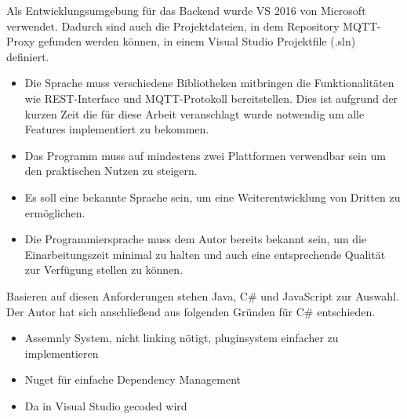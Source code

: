     Als Entwicklungsumgebung für das Backend wurde \ac{VS} 2016 \cite{microsoft_2019} von Microsoft verwendet. Dadurch sind auch die Projektdateien, in dem Repository \glqq MQTT-Proxy\grqq{} \cite{eisenschmidt_2019} gefunden werden können, in einem Visual Studio Projektfile (.sln) definiert.
    
    \begin{itemize}
        \item Die Sprache muss verschiedene Bibliotheken mitbringen die Funktionalitäten wie REST-Interface und \ac{MQTT}-Protokoll bereitstellen. Dies ist aufgrund der kurzen Zeit die für diese Arbeit veranschlagt wurde notwendig um alle Features implementiert zu bekommen.
        \item Das Programm muss auf mindestens zwei Plattformen verwendbar sein um den praktischen Nutzen zu steigern.
        \item Es soll eine bekannte Sprache sein, um eine Weiterentwicklung von Dritten zu ermöglichen.
        \item Die Programmiersprache muss dem Autor bereits bekannt sein, um die Einarbeitungszeit minimal zu halten und auch eine entsprechende Qualität zur Verfügung stellen zu können.
    \end{itemize}
    Basieren auf diesen Anforderungen stehen Java, C\# und JavaScript zur Auswahl.
    Der Autor hat sich anschließend aus folgenden Gründen für C\# entschieden.
    \begin{itemize}
        \item Assemnly System, nicht linking nötigt, pluginsystem einfacher zu implementieren
        \item Nuget für einfache Dependency Management
        \item Da in Visual Studio gecoded wird
    \end{itemize}
    
